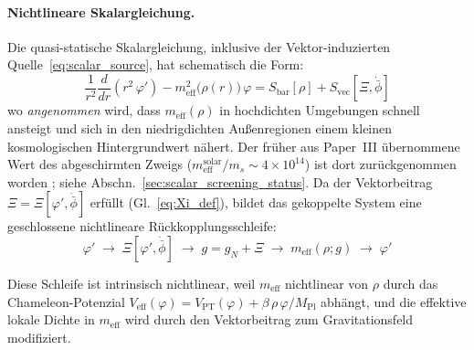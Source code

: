 \documentclass[aps,prd,twocolumn,superscriptaddress,nofootinbib]{revtex4-2}
\begin{document}
\paragraph{Nichtlineare Skalargleichung.}
Die quasi-statische Skalargleichung, inklusive der Vektor-induzierten Quelle~\eqref{eq:scalar_source}, hat schematisch die Form:
\begin{equation}
\frac{1}{r^2}\frac{d}{dr}\!\left(r^2\,\varphi'\right) - m_{\mathrm{eff}}^2\!\big(\rho(r)\big)\,\varphi = S_{\mathrm{bar}}[\rho] + S_{\mathrm{vec}}[\Xi, \dot{\bar{\phi}}]
\label{eq:scalar_chameleon}
\end{equation}
wo \textit{angenommen} wird, dass $m_{\mathrm{eff}}(\rho)$ in hochdichten Umgebungen schnell ansteigt und sich in den niedrigdichten Au\ss{}enregionen einem kleinen kosmologischen Hintergrundwert n\"ahert. Der fr\"uher aus Paper~III \"ubernommene Wert des abgeschirmten Zweigs ($m_{\mathrm{eff}}^{\mathrm{solar}}/m_s \sim 4 \times 10^{14}$) ist dort zur\"uckgenommen worden \cite{Geiger2026c}; siehe Abschn.~\ref{sec:scalar_screening_status}. Da der Vektorbeitrag $\Xi = \Xi[\varphi', \dot{\bar{\phi}}]$ erf\"ullt (Gl.~\ref{eq:Xi_def}), bildet das gekoppelte System eine geschlossene nichtlineare R\"uckkopplungsschleife:
\begin{equation}
\varphi' \;\longrightarrow\; \Xi[\varphi', \dot{\bar{\phi}}] \;\longrightarrow\; g = g_N + \Xi \;\longrightarrow\; m_{\mathrm{eff}}(\rho; g) \;\longrightarrow\; \varphi'
\label{eq:feedback_loop}
\end{equation}

Diese Schleife ist intrinsisch nichtlinear, weil $m_{\mathrm{eff}}$ nichtlinear von $\rho$ durch das Chameleon-Potenzial $V_{\mathrm{eff}}(\varphi) = V_{\mathrm{PT}}(\varphi) + \beta\,\rho\,\varphi/M_{\mathrm{Pl}}$ abh\"angt, und die effektive lokale Dichte in $m_{\mathrm{eff}}$ wird durch den Vektorbeitrag zum Gravitationsfeld modifiziert.
\end{document}
